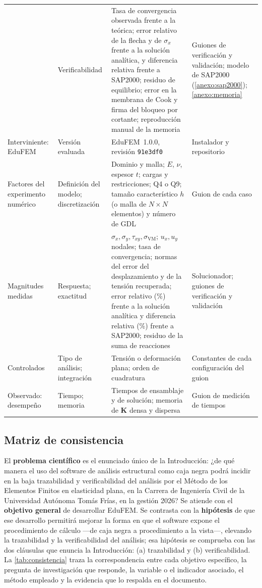 {\begin{longtable}{@{}>{\raggedright\arraybackslash}p{2.9cm}>{\raggedright\arraybackslash}p{2.5cm}>{\raggedright\arraybackslash}p{5.5cm}>{\raggedright\arraybackslash}p{2.7cm}@{}}
 & Verificabilidad & Tasa de convergencia observada frente a la teórica; error relativo de la flecha y de $\sigma_x$ frente a la solución analítica, y diferencia relativa frente a SAP2000; residuo de equilibrio; error en la membrana de Cook y firma del bloqueo por cortante; reproducción manual de la memoria & Guiones de verificación y validación; modelo de SAP2000 (\autoref{anexo:sap2000}); \autoref{anexo:memoria} \\
Interviniente: EduFEM & Versión evaluada & EduFEM~1.0.0, revisión \texttt{91e3df0} & Instalador y repositorio \\
\midrule
Factores del experimento numérico & Definición del modelo; discretización & Dominio y malla; $E$, $\nu$, espesor $t$; cargas y restricciones; Q4 o Q9; tamaño característico $h$ (o malla de $N\times N$ elementos) y número de GDL & Guion de cada caso \\
Magnitudes medidas & Respuesta; exactitud & $\sigma_x,\sigma_y,\tau_{xy},\sigma_{\mathrm{VM}}$; $u_x,u_y$ nodales; tasa de convergencia; normas del error del desplazamiento y de la tensión recuperada; error relativo (\%) frente a la solución analítica y diferencia relativa (\%) frente a SAP2000; residuo de la suma de reacciones & Solucionador; guiones de verificación y validación \\
Controlados & Tipo de análisis; integración & Tensión o deformación plana; orden de cuadratura & Constantes de cada configuración del guion \\
Observado: desempeño & Tiempo; memoria & Tiempos de ensamblaje y de solución; memoria de $\bm{K}$ densa y dispersa & Guion de medición de tiempos \\
\end{longtable}}

\subsection{Matriz de consistencia}
\label{sec:matriz-consistencia}

El \textbf{problema científico} es el enunciado único de la Introducción: ¿de qué manera el uso del software de análisis estructural como caja negra podrá incidir en la baja trazabilidad y verificabilidad del análisis por el Método de los Elementos Finitos en elasticidad plana, en la Carrera de Ingeniería Civil de la Universidad Autónoma Tomás Frías, en la gestión 2026? Se atiende con el \textbf{objetivo general} de desarrollar EduFEM. Se contrasta con la \textbf{hipótesis} de que ese desarrollo permitirá mejorar la forma en que el software expone el procedimiento de cálculo ---de caja negra a procedimiento a la vista---, elevando la trazabilidad y la verificabilidad del análisis; esa hipótesis se comprueba con las dos cláusulas que enuncia la Introducción: (a) trazabilidad y (b) verificabilidad. La \autoref{tab:consistencia} traza la correspondencia entre cada objetivo específico, la pregunta de investigación que responde, la variable o el indicador asociado, el método empleado y la evidencia que lo respalda en el documento.

